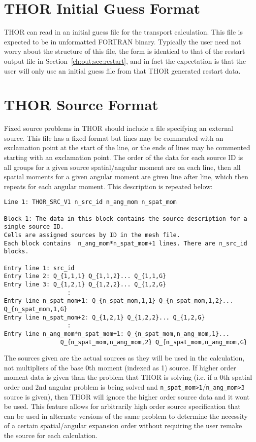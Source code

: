 \section{THOR Initial Guess Format}\label{ch:inp:sec:initguess}

\ac{THOR} can read in an initial guess file for the transport calculation.
This file is expected to be in unformatted FORTRAN binary.
Typically the user need not worry about the structure of this file, the form is identical to that of the restart output file in Section~\ref{ch:out:sec:restart}, and in fact the expectation is that the user will only use an initial guess file from that \ac{THOR} generated restart data.

\section{THOR Source Format}\label{ch:inp:sec:srcfile}

Fixed source problems in \ac{THOR} should include a file specifying an external source.
This file has a fixed format but lines may be commented with an exclamation point at the start of the line, or the ends of lines may be commented starting with an exclamation point.
The order of the data for each source ID is all groups for a given source spatial/angular moment are on each line, then all spatial moments for a given angular moment are given line after line, which then repeats for each angular moment.
This description is repeated below:
\begin{verbatim}
Line 1: THOR_SRC_V1 n_src_id n_ang_mom n_spat_mom

Block 1: The data in this block contains the source description for a single source ID.
Cells are assigned sources by ID in the mesh file.
Each block contains  n_ang_mom*n_spat_mom+1 lines. There are n_src_id blocks.

Entry line 1: src_id
Entry line 2: Q_{1,1,1} Q_{1,1,2}... Q_{1,1,G}
Entry line 3: Q_{1,2,1} Q_{1,2,2}... Q_{1,2,G}
                  :
Entry line n_spat_mom+1: Q_{n_spat_mom,1,1} Q_{n_spat_mom,1,2}... Q_{n_spat_mom,1,G}
Entry line n_spat_mom+2: Q_{1,2,1} Q_{1,2,2}... Q_{1,2,G}
                  :
Entry line n_ang_mom*n_spat_mom+1: Q_{n_spat_mom,n_ang_mom,1}...
                Q_{n_spat_mom,n_ang_mom,2} Q_{n_spat_mom,n_ang_mom,G}
\end{verbatim}
The sources given are the actual sources as they will be used in the calculation, not multipliers of the base 0th moment (indexed as 1) source.
If higher order moment data is given than the problem that \ac{THOR} is solving (i.e. if a 0th spatial order and 2nd angular problem is being solved and \verb"n_spat_mom>1"/\verb"n_ang_mom>3" source is given), then \ac{THOR} will ignore the higher order source data and it wont be used.
This feature allows for arbitrarily high order source specification that can be used in alternate versions of the same problem to determine the necessity of a certain spatial/angular expansion order without requiring the user remake the source for each calculation.



